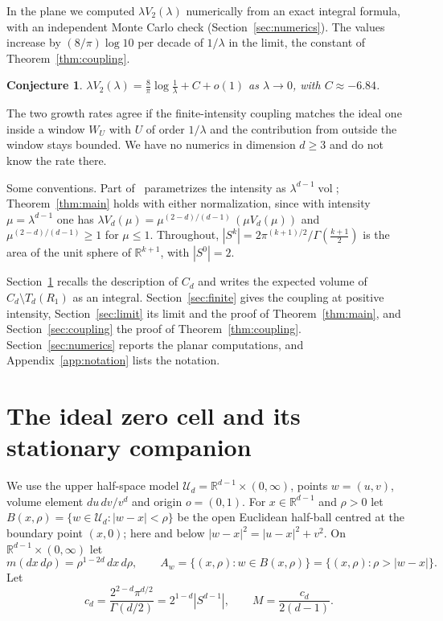 \documentclass[11pt]{amsart}
\newtheorem{conjecture}[theorem]{Conjecture}
\theoremstyle{remark}
\newcommand{\R}{\mathbb{R}}
\newcommand{\vol}{\operatorname{vol}}
\begin{document}
In the plane we computed $\lambda V_2(\lambda)$ numerically from an exact integral formula, with an independent Monte
Carlo check (Section~\ref{sec:numerics}). The values increase by $(8/\pi)\log10$ per decade of $1/\lambda$ in the
limit, the constant of Theorem~\ref{thm:coupling}.

\begin{conjecture}\label{conj:rate}
$\lambda V_2(\lambda)=\frac8\pi\log\frac1\lambda+C+o(1)$ as $\lambda\to0$, with $C\approx-6.84$.
\end{conjecture}

The two growth rates agree if the finite-intensity coupling matches the ideal one inside a window $W_U$ with $U$ of
order $1/\lambda$ and the contribution from outside the window stays bounded. We have no numerics in dimension $d\ge3$
and do not know the rate there.

Some conventions. Part of~\cite{DCELU} parametrizes the intensity as $\lambda^{d-1}\vol$; Theorem~\ref{thm:main}
holds with either normalization, since with intensity $\mu=\lambda^{d-1}$ one has $\lambda V_d(\mu)=\mu^{(2-d)/(d-1)}\,(\mu
V_d(\mu))$ and $\mu^{(2-d)/(d-1)}\ge1$ for $\mu\le1$. Throughout, $|S^{k}|=2\pi^{(k+1)/2}/\Gamma(\frac{k+1}2)$ is the area of the
unit sphere of $\R^{k+1}$, with $|S^0|=2$.

Section~\ref{sec:setting} recalls the description of $C_d$ and writes the expected volume of $C_d\setminus T_d(R_1)$ as
an integral. Section~\ref{sec:finite} gives the coupling at positive intensity, Section~\ref{sec:limit} its limit and
the proof of Theorem~\ref{thm:main}, and Section~\ref{sec:coupling} the proof of Theorem~\ref{thm:coupling}.
Section~\ref{sec:numerics} reports the planar computations, and Appendix~\ref{app:notation} lists the notation.

\section{The ideal zero cell and its stationary companion}\label{sec:setting}

We use the upper half-space model $\mathcal U_d=\R^{d-1}\times(0,\infty)$, points $w=(u,v)$, volume element
$du\,dv/v^d$ and origin $o=(0,1)$. For $x\in\R^{d-1}$ and $\rho>0$ let $B(x,\rho)=\{w\in\mathcal U_d:|w-x|<\rho\}$
be the open Euclidean half-ball centred at the boundary point $(x,0)$; here and below $|w-x|^2=|u-x|^2+v^2$. On
$\R^{d-1}\times(0,\infty)$ let
\[
m(dx\,d\rho)=\rho^{1-2d}\,dx\,d\rho,\qquad A_w=\{(x,\rho):w\in B(x,\rho)\}=\{(x,\rho):\rho>|w-x|\}.
\]
Let
\[
c_d=\frac{2^{2-d}\pi^{d/2}}{\Gamma(d/2)}=2^{1-d}|S^{d-1}|,\qquad M=\frac{c_d}{2(d-1)}.
\]
\end{document}
